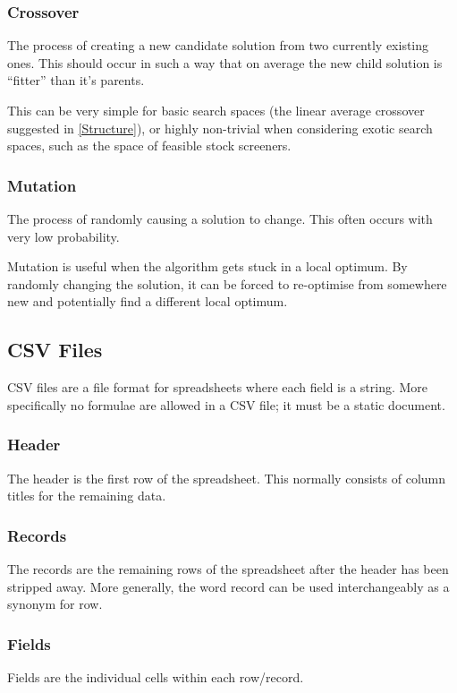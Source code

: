 \subsubsection{Crossover} \label{Crossover}
The process of creating a new candidate solution from two currently existing ones. This should occur in such a way that on average the new child solution is ``fitter'' than it's parents. \newline

This can be very simple for basic search spaces (the linear average crossover suggested in \ref{Structure}), or highly non-trivial when considering exotic search spaces, such as the space of feasible stock screeners.

\subsubsection{Mutation} \label{Mutation}
The process of randomly causing a solution to change. This often occurs with very low probability. \newline

Mutation is useful when the algorithm gets stuck in a local optimum. By randomly changing the solution, it can be forced to re-optimise from somewhere new and potentially find a different local optimum.

\subsection{CSV Files}
CSV files are a file format for spreadsheets where each field is a string. More specifically no formulae are allowed in a CSV file; it must be a static document.

\subsubsection{Header}
The header is the first row of the spreadsheet. This normally consists of column titles for the remaining data.

\subsubsection{Records}
The records are the remaining rows of the spreadsheet after the header has been stripped away. More generally, the word record can be used interchangeably as a synonym for row.

\subsubsection{Fields}
Fields are the individual cells within each row/record.

